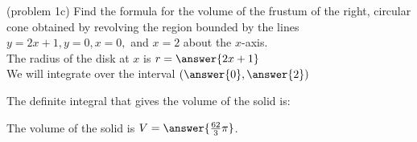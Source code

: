 \documentclass{ximera}
\begin{document}
\begin{problem}(problem 1c)
Find the formula for the volume of the frustum of the right, circular cone obtained by revolving the region bounded by the lines
$y = 2x+1, y=0, x = 0,$ and $x = 2$ about the $x$-axis.\\


The radius of the disk at $x$ is $r = \answer{2x+1}$\\
We will integrate over the interval $\left(\answer{0},\answer{2}\right)$

The definite integral that gives the volume of the solid is:\\
\begin{multipleChoice}
\end{multipleChoice}

The volume of the solid is $V = \answer{\frac{62}{3} \pi }$.


\end{problem}
\end{document}
